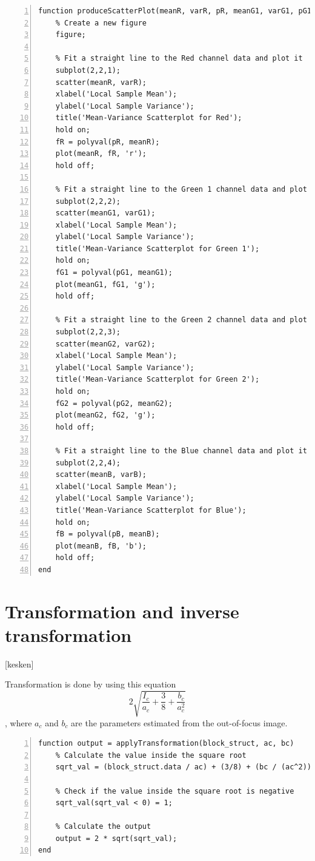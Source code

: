 \documentclass[12pt,a4paper,english
]{tunithesis}
\begin{document}
\begin{lstlisting}[style=Matlab-editor, numbers=left, basicstyle=\small]
function produceScatterPlot(meanR, varR, pR, meanG1, varG1, pG1, meanG2, varG2, pG2, meanB, varB, pB)
    % Create a new figure
    figure;
    
    % Fit a straight line to the Red channel data and plot it
    subplot(2,2,1);
    scatter(meanR, varR);
    xlabel('Local Sample Mean');
    ylabel('Local Sample Variance');
    title('Mean-Variance Scatterplot for Red');
    hold on;
    fR = polyval(pR, meanR);
    plot(meanR, fR, 'r');
    hold off;
    
    % Fit a straight line to the Green 1 channel data and plot it
    subplot(2,2,2);
    scatter(meanG1, varG1);
    xlabel('Local Sample Mean');
    ylabel('Local Sample Variance');
    title('Mean-Variance Scatterplot for Green 1');
    hold on;
    fG1 = polyval(pG1, meanG1);
    plot(meanG1, fG1, 'g');
    hold off;

    % Fit a straight line to the Green 2 channel data and plot it
    subplot(2,2,3);
    scatter(meanG2, varG2);
    xlabel('Local Sample Mean');
    ylabel('Local Sample Variance');
    title('Mean-Variance Scatterplot for Green 2');
    hold on;
    fG2 = polyval(pG2, meanG2);
    plot(meanG2, fG2, 'g');
    hold off;
    
    % Fit a straight line to the Blue channel data and plot it
    subplot(2,2,4);
    scatter(meanB, varB);
    xlabel('Local Sample Mean');
    ylabel('Local Sample Variance');
    title('Mean-Variance Scatterplot for Blue');
    hold on;
    fB = polyval(pB, meanB);
    plot(meanB, fB, 'b');
    hold off;
end
\end{lstlisting}

\section{Transformation and inverse transformation}
[kesken]

Transformation is done by using this equation
\[
2 \sqrt{\frac{I_c}{a_c} + \frac{3}{8} + \frac{b_c}{a_c^2}}
\],
 where $a_c$ and $b_c$ are the parameters estimated from the out-of-focus image.

\begin{lstlisting}[style=Matlab-editor, numbers=left, basicstyle=\small]
% 6. Transformation
function output = applyTransformation(block_struct, ac, bc)
    % Calculate the value inside the square root
    sqrt_val = (block_struct.data / ac) + (3/8) + (bc / (ac^2));

    % Check if the value inside the square root is negative
    sqrt_val(sqrt_val < 0) = 1;

    % Calculate the output
    output = 2 * sqrt(sqrt_val);
end
\end{lstlisting}
\end{document}
